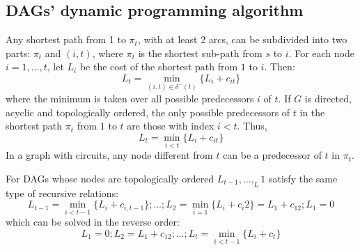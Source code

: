 \documentclass[12pt, a4paper]{report}
\begin{document}
    \subsection{DAGs' dynamic programming algorithm}
    Any shortest path from 1 to $\pi_t$, with at least 2 arcs, can be subdivided into two parts: $\pi_t$ and $(i,t)$, where $\pi_t$ is the shortest sub-path from $s$ to $i$. 
    For each node  $i=1,\dots,t$, let $L_i$ be the cost of the shortest path from $1$ to $i$. Then: 
    \[L_t=\min_{(i,t) \in \delta^{-}(t)}\{L_i+c_{it}\}\]
    where the minimum is taken over all possible predecessors $i$ of $t$. If $G$ is directed, acyclic and topologically ordered, the only possible predecessors of $t$ in the shortest 
    path $\pi_t$ from $1$ to $t$ are those with index $i < t$. Thus,
    \[L_t=\min_{i<t}\{L_i+c_{it}\}\]
    In a graph with circuits, any node different from $t$ can be a predecessor of $t$ in $\pi_t$.  

    For DAGs whose nodes are topologically ordered $L_{t-1},\dots,_L1$ satisfy the same type of recursive relations:
    \[L_{t-1}=\min_{i<t-1}\{L_i+c_{i,t-1}\};\dots;L_2=\min_{i=1}\{L_i+c_i2\}=L_1+c_{12};L_1=0\]
    which can be solved in the reverse order:
    \[L_1=0;L_2=L_1+c_{12};\dots;L_{t}=\min_{i<t-1}\{L_i+c_{t}\}\]
\end{document}
